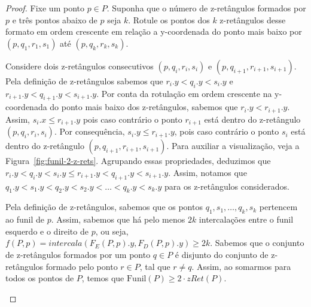 \begin{proof}
    Fixe um ponto $p \in P$. Suponha que o número de z-retângulos formados por $p$ e três pontos abaixo de $p$ seja $k$. Rotule os pontos dos $k$ z-retângulos desse formato em ordem crescente em relação a y-coordenada do ponto mais baixo por $(p,q_1,r_1,s_1)$ até $(p,q_k,r_k,s_k)$.

    Considere dois z-retângulos consecutivos $(p,q_i,r_i,s_i)$ e $(p,q_{i+1},r_{i+1},s_{i+1})$. Pela definição de z-retângulos sabemos que $r_i.y < q_i.y < s_i.y$ e $r_{i+1}.y < q_{i+1}.y < s_{i+1}.y$. Por conta da rotulação em ordem crescente na y-coordenada do ponto mais baixo dos z-retângulos, sabemos que $r_i.y < r_{i+1}.y$. Assim, $s_i.x \leq r_{i+1}.y$ pois caso contrário o ponto $r_{i+1}$ está dentro do z-retângulo $(p,q_i,r_i,s_i)$. Por consequência, $s_i.y \leq r_{i+1}.y$, pois caso contrário o ponto $s_i$ está dentro do z-retângulo $(p,q_{i+1},r_{i+1},s_{i+1})$. Para auxiliar a visualização, veja a Figura~\ref{fig:funil-2-z-rets}. Agrupando essas propriedades, deduzimos que $r_i.y < q_i.y < s_i.y \leq r_{i+1}.y < q_{i+1}.y < s_{i+1}.y$. Assim, notamos que $q_1.y < s_1.y < q_2.y < s_2.y < \ldots < q_k.y < s_k.y$ para os z-retângulos considerados.

    Pela definição de z-retângulos, sabemos que os pontos $q_1,s_1,\ldots,q_k,s_k$ pertencem ao funil de $p$. Assim, sabemos que há pelo menos $2k$ intercalações entre o funil esquerdo e o direito de $p$, ou seja, $f(P,p) = intercala(F_E(P,p).y, F_D(P,p).y) \geq 2k$. Sabemos que o conjunto de z-retângulos formados por um ponto $q \in P$ é disjunto do conjunto de z-retângulos formado pelo ponto $r \in P$, tal que $r \neq q$. Assim, ao somarmos para todos os pontos de $P$, temos que $\text{Funil}(P) \geq 2 \cdot zRet(P)$.

    \begin{figure}
\end{figure}
\end{proof}
